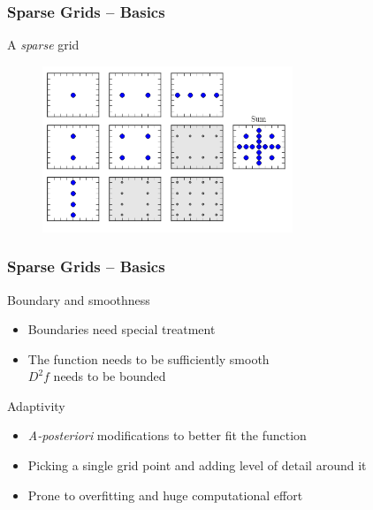 \begin{frame}
  \frametitle{Sparse Grids -- Basics}
  \topline
  \vspace{-10px}
  \begin{block}{A \emph{sparse} grid}
    \begin{figure}[!htp]
      \centering
      \includegraphics[width=7.5cm]{images/sparsegrid_hirach2}
      \vspace{-12px}
      \caption{}
    \end{figure}
  \end{block}
\end{frame}

\begin{frame}
  \frametitle{Sparse Grids -- Basics}
  \topline
  \vspace{-10px}
  \begin{block}{Boundary and smoothness}
    \begin{itemize}
      \item Boundaries need special treatment
      \item The function needs to be sufficiently smooth \\
        $D^2f$ needs to be bounded
      \end{itemize}
  \end{block}
  \begin{block}{Adaptivity}
    \begin{itemize}
      \item \emph{A-posteriori} modifications to better fit the function
      \item Picking a single grid point and adding level of detail around it
      \item Prone to overfitting and huge computational effort
      \end{itemize}
  \end{block}
\end{frame}


